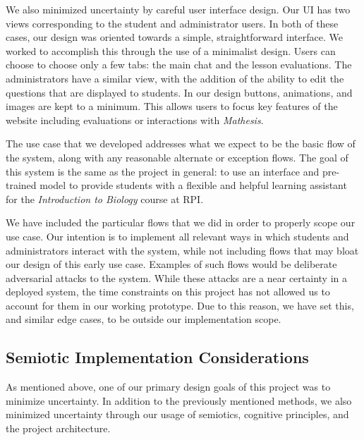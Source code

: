 \documentclass[12pt,a4paper]{article}
\begin{document}
    We also minimized uncertainty by careful user interface design.  Our UI has
     two views corresponding to the student and administrator users.  In both of these cases, our design
    was oriented towards a simple, straightforward interface.  We worked to accomplish this through
    the use of a minimalist design.  Users can choose to choose only a few tabs: the main chat and
    the lesson evaluations.  The administrators have a similar view, with the addition of the ability
    to edit the questions that are displayed to students.  In our design buttons, animations, and
    images are kept to a minimum.  This allows users to focus key features of the website including 
    evaluations or interactions with \textit{Mathesis}.

    The use case that we developed addresses what we expect to be the basic flow of the system, along
    with any reasonable alternate or exception flows.  The goal of this system is the same as the
    project in general: to use an interface and pre-trained model to provide students with a flexible
    and helpful learning assistant for the \textit{Introduction to Biology} course at RPI.

    We have included the particular flows that we did in order to properly scope our use case.  Our intention
    is to implement all relevant ways in which students and administrators interact with the system,
    while not including flows that may bloat our design of this early use case.  Examples
    of such flows would be deliberate adversarial attacks to the system.  While these attacks are a
    near certainty in a deployed system, the time constraints on this project has not allowed us to
    account for them in our working prototype. Due to this reason, we have set this, and similar
    edge cases, to be outside our implementation scope.

    \subsection{Semiotic Implementation Considerations}

    As mentioned above, one of our primary design goals of this project was to minimize uncertainty.
    In addition to the previously mentioned methods, we also minimized uncertainty through our
    usage of semiotics, cognitive principles, and the project architecture.
\end{document}
